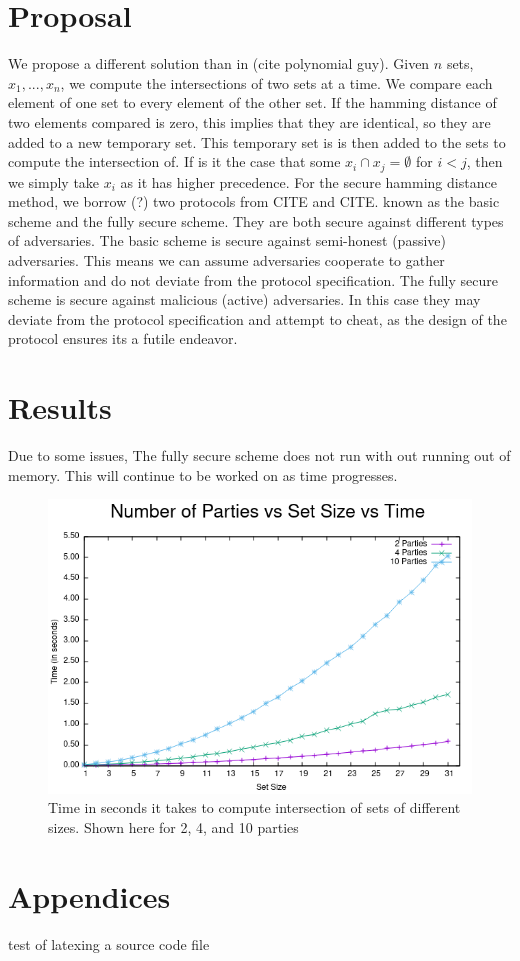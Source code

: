 \documentclass[10pt]{article}
\begin{document}
\section{Proposal}
We propose a different solution than in (cite polynomial guy). Given $n$ sets, $x_1,...,x_n$, we compute the intersections of two sets at a time. We compare each element of one set to every element of the other set. If the hamming distance of two elements compared is zero, this implies that they are identical, so they are added to a new temporary set. This temporary set is is then added to the sets to compute the intersection of. If is it the case that some $x_i \cap x_j = \emptyset$ for $i  < j$, then we simply take $x_i$ as it has higher precedence. For the secure hamming distance method, we borrow (?) two protocols from CITE and CITE. known as the basic scheme and the fully secure scheme. They are both secure against different types of adversaries. The basic scheme is secure against semi-honest (passive) adversaries. This means we can assume adversaries cooperate to gather information and do not deviate from the protocol specification. The fully secure scheme is secure against malicious (active) adversaries. In this case they may deviate from the protocol specification and attempt to cheat, as the design of the protocol ensures its a futile endeavor. 


\section{Results}
Due to some issues, The fully secure scheme does not run with out running out of memory. This will continue to be worked on as time progresses.

\begin{figure}[ht]
\centering
\includegraphics[scale=0.64]{g6} 
\caption{Time in seconds it takes to compute intersection of sets of different sizes. Shown here for 2, 4, and 10 parties}
\end{figure}





\section{Appendices}
test of latexing a source code file

\end{document}
